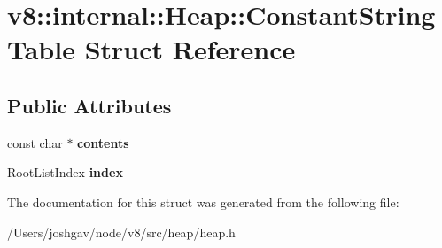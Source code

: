 \hypertarget{structv8_1_1internal_1_1_heap_1_1_constant_string_table}{}\section{v8\+:\+:internal\+:\+:Heap\+:\+:Constant\+String\+Table Struct Reference}
\label{structv8_1_1internal_1_1_heap_1_1_constant_string_table}
\subsection*{Public Attributes}
\begin{DoxyCompactItemize}
\item 
const char $\ast$ {\bfseries contents}\hypertarget{structv8_1_1internal_1_1_heap_1_1_constant_string_table_a6eba7c39e60444e9cb5858b1705e65dd}{}\label{structv8_1_1internal_1_1_heap_1_1_constant_string_table_a6eba7c39e60444e9cb5858b1705e65dd}

\item 
Root\+List\+Index {\bfseries index}\hypertarget{structv8_1_1internal_1_1_heap_1_1_constant_string_table_a62c547d247391464b9f699e427092132}{}\label{structv8_1_1internal_1_1_heap_1_1_constant_string_table_a62c547d247391464b9f699e427092132}

\end{DoxyCompactItemize}


The documentation for this struct was generated from the following file\+:\begin{DoxyCompactItemize}
\item 
/\+Users/joshgav/node/v8/src/heap/heap.\+h\end{DoxyCompactItemize}

